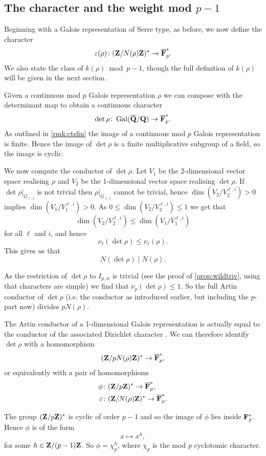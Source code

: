 \documentclass[a4paper,12pt]{article}
\begin{document}
\subsection{The character and the weight mod $p-1$}\label{subsec:char}
Beginning with a Galois representation of Serre type, as before, we now define the character
\[
\varepsilon(\rho)\colon  (\mathbf{Z}/N(\rho)\mathbf{Z})^* \to \overline{\mathbf{F}}_p^*.
\]
We also state the class of $k(\rho)$~mod~$p-1$, though the full definition of $k(\rho)$ will be given in the next section.

Given a continuous mod $p$ Galois representation $\rho$ we can compose with the determinant map to obtain a continuous character
\[
\det \rho\colon \operatorname{Gal}(\overline{\mathbf{Q}}/\mathbf{Q}) \to \overline{\mathbf{F}}_p^*.
\]
As outlined in \cref{rmk:ctsfin} the image of a continuous mod $p$ Galois representation is finite.
Hence the image of $\det \rho$ is a finite multiplicative subgroup of a field, so the image is cyclic.

We now compute the conductor of $\det\rho$.
Let $V_1$ be the 2-dimensional vector space realising $\rho$ and $V_2$ be the 1-dimensional vector space realising $\det\rho$.
If $\det\rho|_{G_{\ell, i}}$ is not trivial then $\rho|_{G_{\ell,i}}$ cannot be trivial, hence $\dim(V_2/V_2^{\ell,i}) > 0$ implies $\dim(V_1/V_1^{\ell,i}) > 0$.
As $0 \le \dim(V_2/V_2^{\ell,i}) \le 1$ we get that
\[
\dim(V_2/V_2^{\ell,i})\le \dim(V_1/V_1^{\ell,i})
\]
for all $\ell$ and $i$, and hence
\[
\nu_\ell(\det\rho) \le \nu_\ell(\rho).
\]
This gives us that
\[
N(\det\rho) \mid N(\rho).
\]

As the restriction of $\det\rho$ to $I_{p,w}$ is trivial (see the proof of \cref{prop:wildtriv}, using that characters are simple) we find that $\nu_p(\det\rho)\le 1$.
So the full Artin conductor of $\det\rho$ (i.e. the conductor as introduced earlier, but including the $p$-part now) divides $pN(\rho)$.

The Artin conductor of a 1-dimensional Galois representation is actually equal to the conductor of the associated Dirichlet character \cite[p. 228]{SerreLF}.
We can therefore identify $\det\rho$ with a homomorphism
\[
(\mathbf{Z}/pN(\rho)\mathbf{Z})^* \to \overline{\mathbf{F}}_p^*,
\]
or equivalently with a pair of homomorphisms
\begin{align*}
\phi\colon& (\mathbf{Z}/p\mathbf{Z})^* \to \overline{\mathbf{F}}_p^*,\\
\varepsilon\colon& (\mathbf{Z}/N(\rho)\mathbf{Z})^* \to \overline{\mathbf{F}}_p^*.
\end{align*}

The group $(\mathbf{Z}/p\mathbf{Z})^*$ is cyclic of order $p-1$ and so the image of $\phi$ lies inside $\mathbf{F}_p^*$.
Hence $\phi$ is of the form
\[
x \mapsto x^h,
\]
for some $h \in \mathbf{Z}/(p-1)\mathbf{Z}$.
So $\phi = \chi_p^h$, where $\chi_p$ is the mod $p$ cyclotomic character.
\end{document}
